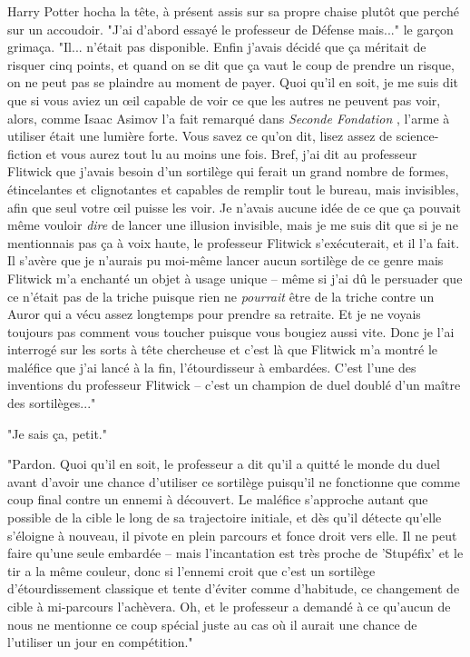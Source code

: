 Harry Potter hocha la tête, à présent assis sur sa propre chaise plutôt que perché sur un accoudoir. "J'ai d'abord essayé le professeur de Défense mais..." le garçon grimaça. "Il... n'était pas disponible. Enfin j'avais décidé que ça méritait de risquer cinq points, et quand on se dit que ça vaut le coup de prendre un risque, on ne peut pas se plaindre au moment de payer. Quoi qu'il en soit, je me suis dit que si vous aviez un œil capable de voir ce que les autres ne peuvent pas voir, alors, comme Isaac Asimov l'a fait remarqué dans \emph{Seconde Fondation} , l'arme à utiliser était une lumière forte. Vous savez ce qu'on dit, lisez assez de science-fiction et vous aurez tout lu au moins une fois. Bref, j'ai dit au professeur Flitwick que j'avais besoin d'un sortilège qui ferait un grand nombre de formes, étincelantes et clignotantes et capables de remplir tout le bureau, mais invisibles, afin que seul votre œil puisse les voir. Je n'avais aucune idée de ce que ça pouvait même vouloir \emph{dire}  de lancer une illusion invisible, mais je me suis dit que si je ne mentionnais pas ça à voix haute, le professeur Flitwick s'exécuterait, et il l'a fait. Il s'avère que je n'aurais pu moi-même lancer aucun sortilège de ce genre mais Flitwick m'a enchanté un objet à usage unique – même si j'ai dû le persuader que ce n'était pas de la triche puisque rien ne \emph{pourrait}  être de la triche contre un Auror qui a vécu assez longtemps pour prendre sa retraite. Et je ne voyais toujours pas comment vous toucher puisque vous bougiez aussi vite. Donc je l'ai interrogé sur les sorts à tête chercheuse et c'est là que Flitwick m'a montré le maléfice que j'ai lancé à la fin, l'étourdisseur à embardées. C'est l'une des inventions du professeur Flitwick – c'est un champion de duel doublé d'un maître des sortilèges..."

"Je sais ça, petit."

"Pardon. Quoi qu'il en soit, le professeur a dit qu'il a quitté le monde du duel avant d'avoir une chance d'utiliser ce sortilège puisqu'il ne fonctionne que comme coup final contre un ennemi à découvert. Le maléfice s'approche autant que possible de la cible le long de sa trajectoire initiale, et dès qu'il détecte qu'elle s'éloigne à nouveau, il pivote en plein parcours et fonce droit vers elle. Il ne peut faire qu'une seule embardée – mais l'incantation est très proche de 'Stupéfix' et le tir a la même couleur, donc si l'ennemi croit que c'est un sortilège d'étourdissement classique et tente d'éviter comme d'habitude, ce changement de cible à mi-parcours l'achèvera. Oh, et le professeur a demandé à ce qu'aucun de nous ne mentionne ce coup spécial juste au cas où il aurait une chance de l'utiliser un jour en compétition."

